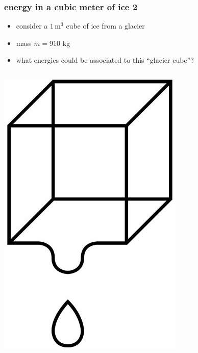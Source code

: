 \documentclass{beamer}
\begin{document}
\begin{frame}
  \frametitle{energy in a cubic meter of ice 2}

\begin{itemize}
\item consider a $1\,\text{m}^3$ cube of ice from a glacier
\item mass $m=910$ kg
\item what energies could be associated to this ``glacier cube''?
\end{itemize}

\begin{columns}
\begin{column}{0.25\textwidth}
  \begin{center}
    \includegraphics[width=\textwidth]{cube-drip.jpg}
  \end{center}
\end{column}
\begin{column}{0.85\textwidth}


\end{column}
\end{columns}
\end{frame}
\end{document}
